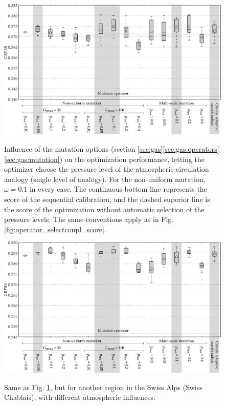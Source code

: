 \documentclass{ametsoc}
\begin{document}
\begin{figure}[t]
	\begin{center}
		\noindent\includegraphics[width=33pc,angle=0]{fig10.pdf}\\
	\end{center}
	\caption{Influence of the mutation options (section \ref{sec:gas}\ref{sec:gas:operators}\ref{sec:gas:mutation}) on the optimization performance, letting the optimizer choose the pressure level of the atmospheric circulation analogy (single level of analogy). For the non-uniform mutation, $\omega=0.1$ in every case. The continuous bottom line represents the score of the sequential calibration, and the dashed superior line is the score of the optimization without automatic selection of the pressure levels. The same conventions apply as in Fig. \ref{fig:operator_selectcoupl_score}.}
	\label{fig:operator_mutation_score_atmlevel}
\end{figure}

\begin{figure}[t]
	\begin{center}
		\noindent\includegraphics[width=33pc,angle=0]{fig11.pdf}\\
	\end{center}
	\caption{Same as Fig. \ref{fig:operator_mutation_score_atmlevel}, but for another region in the Swiss Alps (Swiss Chablais), with different atmospheric influences.}
	\label{fig:operator_mutation_score_rhoneamont}
\end{figure}
\end{document}
